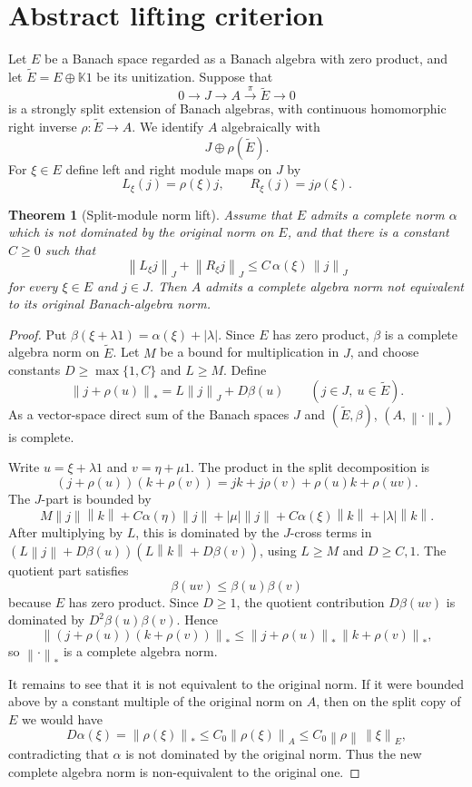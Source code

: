 \documentclass[11pt]{article}
\newtheorem{theorem}{Theorem}
\newcommand{\norm}[1]{\left\lVert #1\right\rVert}
\newcommand{\wt}[1]{\widetilde{#1}}
\begin{document}
\section*{Abstract lifting criterion}

Let \(E\) be a Banach space regarded as a Banach algebra with zero product, and
let \(\wt E=E\oplus \mathbb K1\) be its unitization.  Suppose that
\[
0\longrightarrow J\longrightarrow A
 \stackrel{\pi}{\longrightarrow}\wt E\longrightarrow 0
\]
is a strongly split extension of Banach algebras, with continuous homomorphic
right inverse \(\rho:\wt E\to A\).  We identify \(A\) algebraically with
\[
J\oplus \rho(\wt E).
\]
For \(\xi\in E\) define left and right module maps on \(J\) by
\[
L_\xi(j)=\rho(\xi)j,\qquad R_\xi(j)=j\rho(\xi).
\]

\begin{theorem}[Split-module norm lift]
\label{thm:lift}
Assume that \(E\) admits a complete norm \(\alpha\) which is not dominated by
the original norm on \(E\), and that there is a constant \(C\geq 0\) such that
\[
  \norm{L_\xi j}_J+\norm{R_\xi j}_J
  \leq C\,\alpha(\xi)\,\norm{j}_J
\]
for every \(\xi\in E\) and \(j\in J\).  Then \(A\) admits a complete algebra
norm not equivalent to its original Banach-algebra norm.
\end{theorem}

\begin{proof}
Put \(\beta(\xi+\lambda1)=\alpha(\xi)+|\lambda|\).  Since \(E\) has zero
product, \(\beta\) is a complete algebra norm on \(\wt E\).  Let \(M\) be a
bound for multiplication in \(J\), and choose constants \(D\geq\max\{1,C\}\)
and \(L\geq M\).  Define
\[
  \norm{j+\rho(u)}_* = L\norm{j}_J+D\beta(u)
  \qquad (j\in J,\ u\in \wt E).
\]
As a vector-space direct sum of the Banach spaces \(J\) and \((\wt E,\beta)\),
\((A,\norm{\cdot}_*)\) is complete.

Write \(u=\xi+\lambda1\) and \(v=\eta+\mu1\).  The product in the split
decomposition is
\[
(j+\rho(u))(k+\rho(v))
=jk+j\rho(v)+\rho(u)k+\rho(uv).
\]
The \(J\)-part is bounded by
\[
M\norm j\norm k+C\alpha(\eta)\norm j+|\mu|\norm j
+C\alpha(\xi)\norm k+|\lambda|\norm k.
\]
After multiplying by \(L\), this is dominated by the \(J\)-cross terms in
\((L\norm j+D\beta(u))(L\norm k+D\beta(v))\), using \(L\geq M\) and
\(D\geq C,1\).  The quotient part satisfies
\[
\beta(uv)\leq \beta(u)\beta(v)
\]
because \(E\) has zero product.  Since \(D\geq1\), the quotient contribution
\(D\beta(uv)\) is dominated by \(D^2\beta(u)\beta(v)\).  Hence
\[
\norm{(j+\rho(u))(k+\rho(v))}_*
\leq \norm{j+\rho(u)}_*\,\norm{k+\rho(v)}_*,
\]
so \(\norm{\cdot}_*\) is a complete algebra norm.

It remains to see that it is not equivalent to the original norm.  If it were
bounded above by a constant multiple of the original norm on \(A\), then on the
split copy of \(E\) we would have
\[
D\alpha(\xi)=\norm{\rho(\xi)}_*
\leq C_0\norm{\rho(\xi)}_A
\leq C_0\norm{\rho}\,\norm{\xi}_E,
\]
contradicting that \(\alpha\) is not dominated by the original norm.  Thus the
new complete algebra norm is non-equivalent to the original one.
\end{proof}
\end{document}

